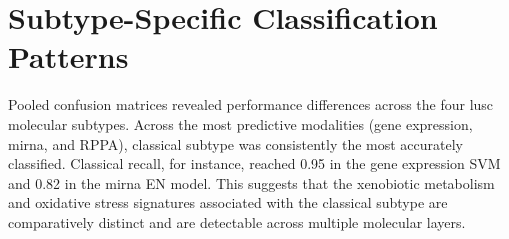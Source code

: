 \begin{table}[ht]
\scriptsize
\setlength{\tabcolsep}{2pt}
\caption[Model performance across omics modalities]{Mean accuracy and macro F1 ($\pm$ standard deviation, 5-fold cross-validation) for all classifiers across five omics modalities. Values are shown as accuracy/macro F1 $\pm$ standard deviation of macro F1.}
\centering
{}
\label{tab:model_performance_summary}
\end{table}

\section{Subtype-Specific Classification Patterns}

Pooled confusion matrices revealed performance differences across the four \gls{lusc} molecular subtypes. Across the most predictive modalities (gene expression, \gls{mirna}, and RPPA), classical subtype was consistently the most accurately classified. Classical recall, for instance, reached 0.95 in the gene expression SVM and 0.82 in the \gls{mirna} EN model. This suggests that the xenobiotic metabolism and oxidative stress signatures associated with the classical subtype are comparatively distinct and are detectable across multiple molecular layers.


